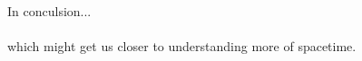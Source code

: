 \documentclass[12pt, a4paper]{book}
\begin{document}
In conculsion... \\
\\which might get us closer to understanding more of spacetime.
\end{document}

